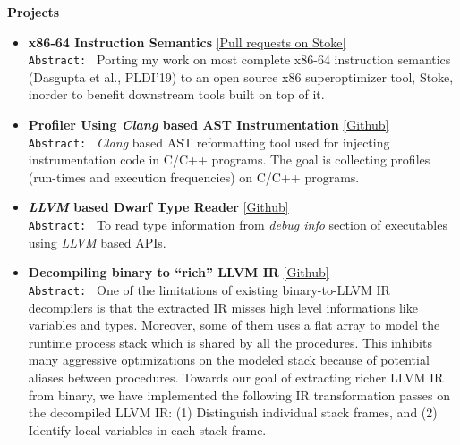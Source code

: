 \documentclass[9pt]{article}
\newenvironment{changemargin}[2]{%
  \begin{list}{}{%
    \setlength{\topsep}{0pt}%
    \setlength{\leftmargin}{#1}%
    \setlength{\rightmargin}{#2}%
    \setlength{\listparindent}{\parindent}%
    \setlength{\itemindent}{\parindent}%
    \setlength{\parsep}{\parskip}%
  }%
  \item[]}{\end{list}
}
\newenvironment{body} {
	\vspace*{-16pt}
	\begin{changemargin}{-0.25in}{-0.5in}
  }	
	{\end{changemargin}
}
\begin{document}
\begin{body}
	\vspace{14pt}
	\textbf{Projects}{} \hfill  \\
	\begin{itemize} \itemsep 3pt

           \item \textbf{x86-64 Instruction Semantics}
           \href{https://github.com/StanfordPL/stoke/pulls?q=is%3Apr+author%3Asdasgup3+is%3Aclosed}{[Pull requests on Stoke]} \\ 
           \texttt{Abstract: } Porting my work on most complete x86-64 instruction semantics (Dasgupta et al., PLDI'19) to an
open source x86 superoptimizer tool, Stoke, inorder to benefit downstream tools built on top of it.


           \item \textbf{Profiler Using \emph{Clang} based AST Instrumentation}
           \href{https://github.com/sdasgup3/profiler-using-clang-based-ast-instrumentation}{[Github]} \\ 
           \texttt{Abstract: } \emph{Clang} based AST reformatting tool used for
           injecting instrumentation code in C/C++ programs. The goal is
           collecting profiles (run-times and execution frequencies) on C/C++
           programs.

           \item \textbf{\emph{LLVM} based Dwarf Type Reader} 
           \href{https://github.com/sdasgup3/dwarf-type-reader}{[Github]} \\
             \texttt{Abstract: } To read type information from \emph{debug info}
             section of executables using \emph{LLVM} based APIs.

           \item \textbf{Decompiling binary to ``rich'' LLVM IR}
           \href{https://github.com/sdasgup3/binary-decompilation/blob/master/libs/stack_deconstructor/stack_deconstructor.cpp}{[Github]} \\ 

\texttt{Abstract: } One of the limitations of existing binary-to-LLVM IR
decompilers is that the extracted IR misses high level informations like
variables and types. Moreover, some of them uses a flat array to model the
runtime process stack which is shared by all the procedures. This inhibits many
aggressive optimizations on the modeled stack because of potential aliases
between procedures.  Towards our goal of extracting richer LLVM IR from binary,
        we have implemented the following IR transformation passes on the
        decompiled LLVM IR: (1) Distinguish individual stack frames, and (2)
        Identify local variables in each stack frame.


\end{itemize}
\end{body}
\end{document}
